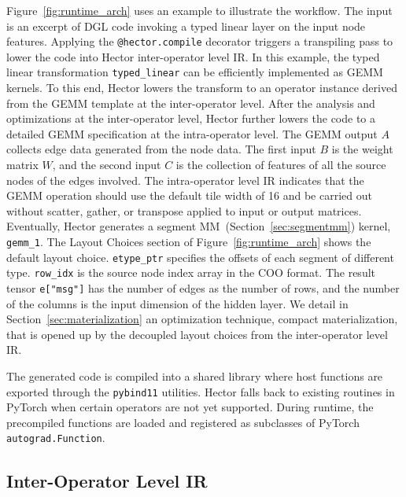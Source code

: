 Figure~\ref{fig:runtime_arch} uses an example to illustrate the workflow. The input is an excerpt of DGL code invoking a typed linear layer on the input node features. Applying the \texttt{@hector.compile} decorator triggers a transpiling pass to lower the code into Hector inter-operator level IR. {In this example, the typed linear transformation \texttt{typed\_linear}} can be efficiently implemented as GEMM kernels. {To this end,} Hector lowers the transform to an operator instance derived from the GEMM template at the inter-operator level. {After the analysis and optimizations at the inter-operator level, Hector further lowers the code to a detailed GEMM specification at the intra-operator level.} The GEMM output $A$ collects edge data generated from the node data. The first input $B$ is the weight matrix $W$, and the second input $C$ is the collection of features of all the source nodes of the edges involved. The intra-operator level IR indicates that the GEMM operation should use the default tile width of 16 and be carried out without scatter, gather, or transpose applied to input or output matrices. Eventually, Hector generates a segment MM~(Section~\ref{sec:segmentmm}) kernel, \texttt{gemm\_1}. 
The Layout Choices section of Figure~\ref{fig:runtime_arch} shows the default layout choice. \texttt{etype\_ptr} specifies the offsets of each segment of different type. \texttt{row\_idx} is the source node index array in the COO format. The result tensor \texttt{e["msg"]} has the number of edges as the number of rows, and the number of the columns is the input dimension of the hidden layer. We detail in Section~\ref{sec:materialization} an optimization technique, compact materialization, that is opened up by the decoupled layout choices from the inter-operator level IR.




The generated code is compiled into a shared library where host functions are exported through the \texttt{pybind11} utilities.
Hector falls back to existing routines in PyTorch when certain operators are not yet supported.
During runtime, the precompiled functions are loaded and registered as subclasses of PyTorch \texttt{autograd.Function}.












\subsection{Inter-Operator Level IR}
\label{sec:inter_op_ir}

